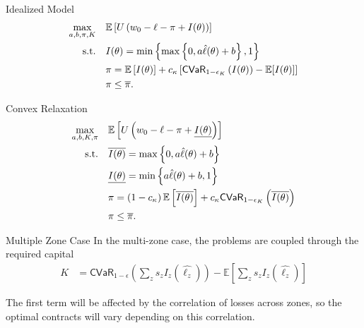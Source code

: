 \documentclass{beamer}
\begin{document}
\begin{frame}{Idealized Model}
\begin{align}
    \max_{a,b,\pi, K}  & \quad \mathbb{E} \left [ U\left ( w_0 - \ell - \pi + I(\theta) \right ) \right ] \label{cons-objective}\\
    \text{s.t.} & \quad I(\theta) =  \min \left \{\max \left \{0,a\hat{\ell}(\theta) + b \right \}, 1 \right \}\label{cons-contract}\\
    & \quad \pi = \mathbb{E}\left [ I(\theta) \right ] + c_{\kappa} \left[ {\sf CVaR}_{1-\epsilon_K}\left ( I(\theta)\right )  - \mathbb{E}[I(\theta)]  \right] \\
    &\quad \pi \leq \overline{\pi}.
\end{align}
\end{frame}


\begin{frame}{Convex Relaxation}
    \begin{align}
        \max_{a,b,K,\pi} &\quad \mathbb{E} \left [  U\left(w_0 - \ell - \pi  +  \underline{I(\theta)} \right) \right ]\label{eq-06}\\
        \text{s.t.} & \quad \overline{I(\theta)} = \max \left \{0,a\hat{\ell}(\theta) + b \right \} \nonumber\\
        & \quad \underline{I(\theta)} = \min \left \{a\hat{\ell}(\theta)+b,1 \right \} \nonumber\\
        & \quad \pi = \left (1-c_{\kappa} \right ) \mathbb{E} \left [ \overline{I(\theta)} \right ] + c_{\kappa} {\sf CVaR}_{1-\epsilon_K} \left( \overline{I(\theta)} \right) \label{eq-41}\\
        & \quad \pi \leq \overline{\pi} \nonumber.
  \end{align}
    
\end{frame}

\begin{frame}{Multiple Zone Case}
    In the multi-zone case, the problems are coupled through the required capital
    \begin{align*}
        K &= \textsf{CVaR}_{1-\epsilon} \left ( \sum_z s_z I_z(\hat{\ell_z}) \right ) - \mathbb{E}\left [\sum_z s_z I_z(\hat{\ell_z}) \right ]
    \end{align*}

    The first term will be affected by the correlation of losses across zones, so the optimal contracts will vary depending on this correlation. 
    
\end{frame}
\end{document}
